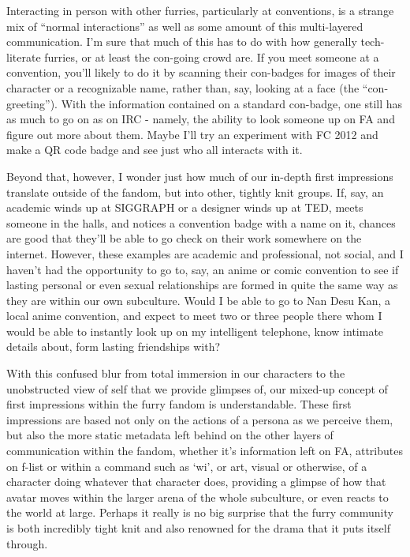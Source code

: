 Interacting in person with other furries, particularly at conventions, is a strange mix of ``normal interactions'' as well as some amount of this multi-layered communication. I'm sure that much of this has to do with how generally tech-literate furries, or at least the con-going crowd are. If you meet someone at a convention, you'll likely to do it by scanning their con-badges for images of their character or a recognizable name, rather than, say, looking at a face (the ``con-greeting''). With the information contained on a standard con-badge, one still has as much to go on as on IRC - namely, the ability to look someone up on FA and figure out more about them. Maybe I'll try an experiment with FC 2012 and make a QR code badge and see just who all interacts with it.

Beyond that, however, I wonder just how much of our in-depth first impressions translate outside of the fandom, but into other, tightly knit groups. If, say, an academic winds up at SIGGRAPH or a designer winds up at TED, meets someone in the halls, and notices a convention badge with a name on it, chances are good that they'll be able to go check on their work somewhere on the internet. However, these examples are academic and professional, not social, and I haven't had the opportunity to go to, say, an anime or comic convention to see if lasting personal or even sexual relationships are formed in quite the same way as they are within our own subculture. Would I be able to go to Nan Desu Kan, a local anime convention, and expect to meet two or three people there whom I would be able to instantly look up on my intelligent telephone, know intimate details about, form lasting friendships with?

With this confused blur from total immersion in our characters to the unobstructed view of self that we provide glimpses of, our mixed-up concept of first impressions within the furry fandom is understandable. These first impressions are based not only on the actions of a persona as we perceive them, but also the more static metadata left behind on the other layers of communication within the fandom, whether it's information left on FA, attributes on f-list or within a command such as `wi', or art, visual or otherwise, of a character doing whatever that character does, providing a glimpse of how that avatar moves within the larger arena of the whole subculture, or even reacts to the world at large. Perhaps it really is no big surprise that the furry community is both incredibly tight knit and also renowned for the drama that it puts itself through.
